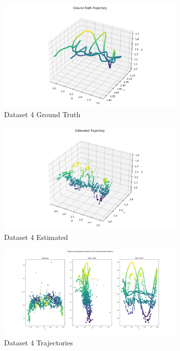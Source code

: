 \documentclass{article}
\begin{document}
\begin{figure}[H]
    \centering
    \includegraphics[width=0.8\textwidth]{./imgs/task1_2/studentdata4_ground_truth.png}
    \caption{Dataset 4 Ground Truth}
\end{figure}

\begin{figure}[H]
    \centering
    \includegraphics[width=0.8\textwidth]{./imgs/task1_2/studentdata4_estimated.png}
    \caption{Dataset 4 Estimated}
\end{figure}

\begin{figure}[H]
    \centering
    \includegraphics[width=0.8\textwidth]{./imgs/task1_2/studentdata4_trajectory_merged.png}
    \caption{Dataset 4 Trajectories}
\end{figure}
\end{document}
